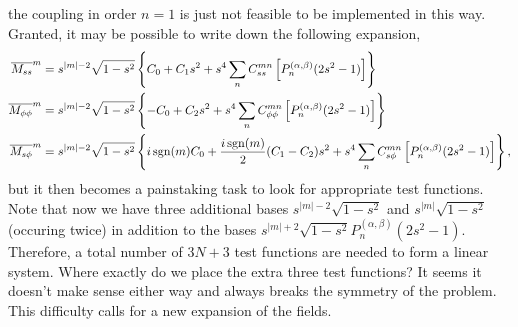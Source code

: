the coupling in order $n=1$ is just not feasible to be implemented in this way. Granted, it may be possible to write down the following expansion,
\[\begin{aligned}
    \overline{M_{ss}}^m &= s^{|m|-2}\sqrt{1-s^2}\left\{C_0 + C_1 s^2 + s^4\sum_n C_{ss}^{mn} \left[P_n^{(\alpha, \beta)}(2s^2-1)\right]\right\} \\
    \overline{M_{\phi\phi}}^m &= s^{|m|-2}\sqrt{1-s^2}\left\{-C_0 + C_2 s^2 + s^4\sum_n C_{\phi\phi}^{mn} \left[P_n^{(\alpha, \beta)}(2s^2-1)\right]\right\} \\
    \overline{M_{s\phi}}^m &= s^{|m|-2}\sqrt{1-s^2}\left\{i\operatorname{sgn}(m)C_0 + \frac{i\operatorname{sgn}(m)}{2}(C_1 - C_2) s^2 + s^4\sum_n C_{s\phi}^{mn} \left[P_n^{(\alpha, \beta)}(2s^2-1)\right]\right\},
\end{aligned}\]
but it then becomes a painstaking task to look for appropriate test functions. 
Note that now we have three additional bases $s^{|m|-2}\sqrt{1 - s^2}$ and $s^{|m|}\sqrt{1 - s^2}$ (occuring twice) in addition to the bases $s^{|m|+2} \sqrt{1 - s^2} P_n^{(\alpha, \beta)}(2s^2 - 1)$. 
Therefore, a total number of $3N+3$ test functions are needed to form a linear system. 
Where exactly do we place the extra three test functions? It seems it doesn't make sense either way and always breaks the symmetry of the problem. 
This difficulty calls for a new expansion of the fields.

